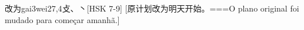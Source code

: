 \begin{EntryWithPhonetic}{改为}{gai3wei2}{7,4}{⽁、⼂}[HSK 7-9]
  [原计划改为明天开始。===O plano original foi mudado para começar amanhã.]
\end{EntryWithPhonetic}
